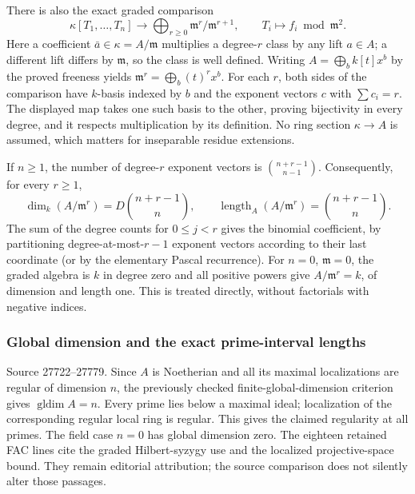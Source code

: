 There is also the exact graded comparison \[
 \kappa[T_1,\ldots,T_n]\longrightarrow
 \bigoplus_{r\geq0}\mathfrak m^r/\mathfrak m^{r+1},
 \qquad T_i\longmapsto f_i\bmod\mathfrak m^2.
\] Here a coefficient \(\bar a\in\kappa=A/\mathfrak m\) multiplies a degree-\(r\) class by any lift \(a\in A\); a different lift differs by \(\mathfrak m\), so the class is well defined. Writing \(A=\bigoplus_b k[t]x^b\) by the proved freeness yields \(\mathfrak m^r=\bigoplus_b(t)^r x^b\). For each \(r\), both sides of the comparison have \(k\)-basis indexed by \(b\) and the exponent vectors \(c\) with \(\sum c_i=r\). The displayed map takes one such basis to the other, proving bijectivity in every degree, and it respects multiplication by its definition. No ring section \(\kappa\to A\) is assumed, which matters for inseparable residue extensions.

If \(n\geq1\), the number of degree-\(r\) exponent vectors is \(\binom{n+r-1}{n-1}\). Consequently, for every \(r\geq1\), \[
 \dim_k(A/\mathfrak m^r)=D\binom{n+r-1}{n},
 \qquad
 \operatorname{length}_A(A/\mathfrak m^r)=\binom{n+r-1}{n}.
\] The sum of the degree counts for \(0\leq j<r\) gives the binomial coefficient, by partitioning degree-at-most-\(r-1\) exponent vectors according to their last coordinate (or by the elementary Pascal recurrence). For \(n=0\), \(\mathfrak m=0\), the graded algebra is \(k\) in degree zero and all positive powers give \(A/\mathfrak m^r=k\), of dimension and length one. This is treated directly, without factorials with negative indices.

\subsubsection{Global dimension and the exact prime-interval lengths}\label{algebra-proof-025-global-dimension-and-the-exact-prime-interval-lengths}

Source 27722--27779. Since \(A\) is Noetherian and all its maximal localizations are regular of dimension \(n\), the previously checked finite-global-dimension criterion gives \(\operatorname{gldim}A=n\). Every prime lies below a maximal ideal; localization of the corresponding regular local ring is regular. This gives the claimed regularity at all primes. The field case \(n=0\) has global dimension zero. The eighteen retained FAC lines cite the graded Hilbert-syzygy use and the localized projective-space bound. They remain editorial attribution; the source comparison does not silently alter those passages.

